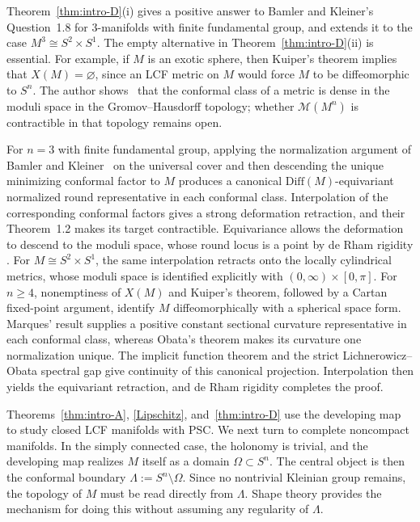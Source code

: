\documentclass[12pt,oneside,a4paper]{article}
\theoremstyle{mytheorem}
\theoremstyle{remark}
\theoremstyle{definition}
\begin{document}
Theorem~\ref{thm:intro-D}(i) gives a positive answer to Bamler and Kleiner's
Question~1.8 for $3$-manifolds with finite fundamental group, and
extends it to the case $M^3\cong S^2\times S^1$. The empty alternative in
Theorem~\ref{thm:intro-D}(ii) is essential. For example, if $M$ is an exotic sphere,
then Kuiper's theorem implies that $X(M)=\varnothing$, since an LCF metric on
$M$ would force $M$ to be diffeomorphic to $S^n$. The
author shows~\cite{zbMATH07368018} that the conformal class of a
metric is dense in the moduli space in the Gromov--Hausdorff topology;
whether $\mathcal{M}(M^n)$ is contractible in that topology remains
open.


For $n=3$ with finite fundamental group, applying the normalization argument
of Bamler and Kleiner~\cite[Lemma~9.2(a)]{2019arXiv190908710B} on the universal
cover and then descending the unique minimizing conformal factor to $M$
produces a canonical $\mathrm{Diff}(M)$-equivariant normalized round
representative in each conformal class. Interpolation of the
corresponding conformal factors gives a strong deformation retraction, and
their Theorem~1.2 makes its target contractible. Equivariance allows the
deformation to descend to the moduli space, whose round locus is a point by
de Rham rigidity \cite{MR43468}. For $M\cong S^2\times S^1$, the same
interpolation retracts onto the locally cylindrical metrics, whose moduli
space is identified explicitly with $(0,\infty)\times[0,\pi]$. For $n\ge4$,
nonemptiness of $X(M)$ and Kuiper's theorem, followed by a Cartan fixed-point
argument, identify $M$ diffeomorphically with a spherical space form.
Marques' result \cite[Corollary~3.2]{MR2950765} supplies a positive constant sectional curvature representative in each
conformal class, whereas Obata's theorem \cite{zbMATH03374588} makes its
curvature one normalization unique. The implicit function theorem and the
strict Lichnerowicz--Obata spectral gap give continuity of this canonical
projection. Interpolation then yields the equivariant retraction, and de
Rham rigidity completes the proof.



Theorems~\ref{thm:intro-A}, \ref{Lipschitz}, and~\ref{thm:intro-D} use the developing map to study closed LCF  manifolds with PSC.  We next turn to complete noncompact manifolds.  In the simply
connected case, the holonomy is trivial, and the developing map realizes
\(M\) itself as a domain $ \Omega\subset S^n .$
The central object is then the conformal boundary $ \Lambda:=S^n\setminus\Omega .$
Since no nontrivial Kleinian group remains, the topology of \(M\) must be read directly from \(\Lambda\).  Shape theory provides the mechanism for doing this without assuming any regularity of \(\Lambda\).
\end{document}
